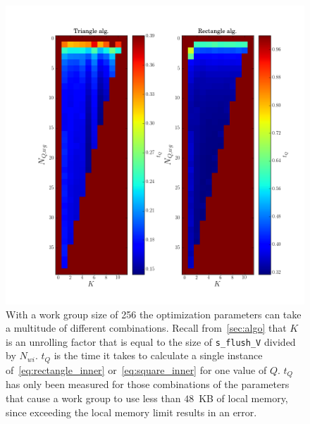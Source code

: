\documentclass[11pt,twoside]{report}
\begin{document}
\begin{figure}[htbp]
	\begin{center}
		\includegraphics[width=\textwidth]{img/256_9216_OPTIMIZE.png}	
	\end{center}
	\caption{With a work group size of 256 the optimization parameters can take a multitude of different combinations.  Recall from~\cref{sec:algo} that $K$ is an unrolling factor that is equal to the size of {\tt s\_flush\_V} divided by $N_{wi}$. $t_{Q}$ is  the time it takes to calculate a single instance of~\cref{eq:rectangle_inner} or~\cref{eq:square_inner} for one value of $Q$. $t_{Q}$ has only been measured for those combinations of the parameters that cause a work group to use less than $48$~KB of local memory, since exceeding the local memory limit results in an error.   \label{fig:optimize}}
\end{figure}
\end{document}
